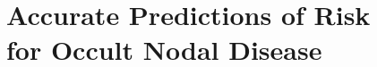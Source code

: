\documentclass[\relativeRoot/main.tex]{subfiles}
\begin{document}
\section[Accurate Predictions of Risk for Occult Nodal Disease]{Accurate Predictions of Risk\\for Occult Nodal Disease}
\label{sec:discussion:model}
\end{document}
